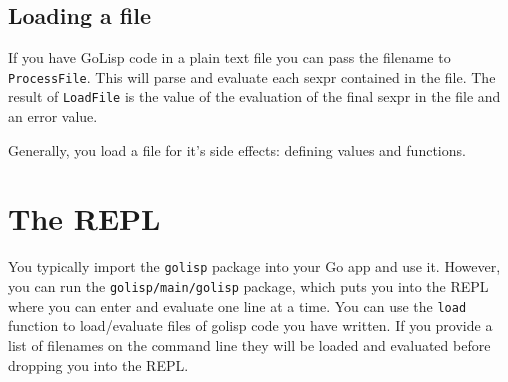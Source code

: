 \documentclass[12pt]{article}
\begin{document}
\subsection{Loading a file}

If you have GoLisp code in a plain text file you can pass the filename
to \verb|ProcessFile|. This will parse and evaluate each sexpr
contained in the file. The result of \verb|LoadFile| is the value of
the evaluation of the final sexpr in the file and an error value.

Generally, you load a file for it's side effects: defining values and
functions.

\section{The REPL}

You typically import the \verb|golisp| package into your Go app and
use it. However, you can run the \verb|golisp/main/golisp| package,
which puts you into the REPL where you can enter and evaluate one line
at a time. You can use the \verb|load| function to load/evaluate files
of golisp code you have written. If you provide a list of filenames on
the command line they will be loaded and evaluated before dropping you
into the REPL.



\end{document}
